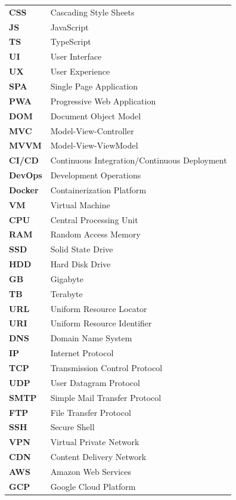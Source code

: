 \begin{longtable}{ll}
\textbf{CSS} & Cascading Style Sheets \\
\textbf{JS} & JavaScript \\
\textbf{TS} & TypeScript \\
\textbf{UI} & User Interface \\
\textbf{UX} & User Experience \\
\textbf{SPA} & Single Page Application \\
\textbf{PWA} & Progressive Web Application \\
\textbf{DOM} & Document Object Model \\
\textbf{MVC} & Model-View-Controller \\
\textbf{MVVM} & Model-View-ViewModel \\
\textbf{CI/CD} & Continuous Integration/Continuous Deployment \\
\textbf{DevOps} & Development Operations \\
\textbf{Docker} & Containerization Platform \\
\textbf{VM} & Virtual Machine \\
\textbf{CPU} & Central Processing Unit \\
\textbf{RAM} & Random Access Memory \\
\textbf{SSD} & Solid State Drive \\
\textbf{HDD} & Hard Disk Drive \\
\textbf{GB} & Gigabyte \\
\textbf{TB} & Terabyte \\
\textbf{URL} & Uniform Resource Locator \\
\textbf{URI} & Uniform Resource Identifier \\
\textbf{DNS} & Domain Name System \\
\textbf{IP} & Internet Protocol \\
\textbf{TCP} & Transmission Control Protocol \\
\textbf{UDP} & User Datagram Protocol \\
\textbf{SMTP} & Simple Mail Transfer Protocol \\
\textbf{FTP} & File Transfer Protocol \\
\textbf{SSH} & Secure Shell \\
\textbf{VPN} & Virtual Private Network \\
\textbf{CDN} & Content Delivery Network \\
\textbf{AWS} & Amazon Web Services \\
\textbf{GCP} & Google Cloud Platform \\

\end{longtable}
